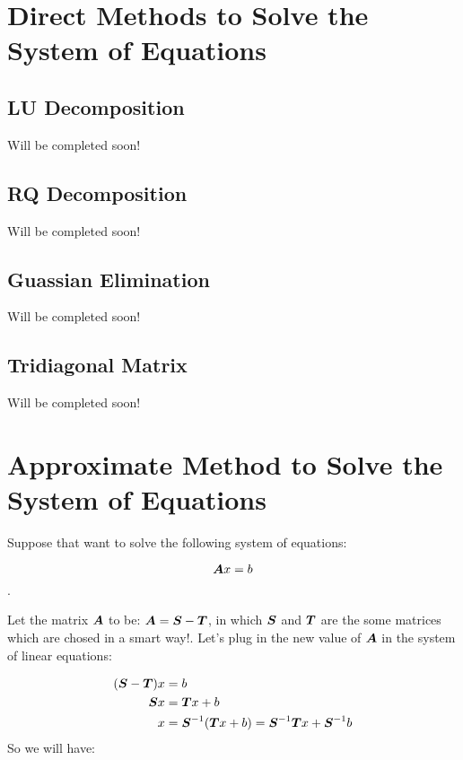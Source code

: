 



\section{Direct Methods to Solve the System of Equations}
\subsection{LU Decomposition}

Will be completed soon!

\subsection{RQ Decomposition}

Will be completed soon!

\subsection{Guassian Elimination}

Will be completed soon!

\subsection{Tridiagonal Matrix}

Will be completed soon!

\section{Approximate Method to Solve the System of Equations}

Suppose that want to solve the following system of equations:

\[ \boldsymbol{A} x = b \].

Let the matrix $\boldsymbol{A}$ to be: $\boldsymbol{A} = \boldsymbol{S} - \boldsymbol{T}$, in which $\boldsymbol{S}$ and $\boldsymbol{T}$ are the some matrices which are chosed in a smart way!. Let's plug in the new value of $\boldsymbol{A}$ in the system of linear equations:

\begin{align*}
	(\boldsymbol{S} - \boldsymbol{T}) x &= b \\
	\boldsymbol{S} x &= \boldsymbol{T} x + b \\
	x &= \boldsymbol{S}^{-1} (\boldsymbol{T} x + b) =  \boldsymbol{S}^{-1} \boldsymbol{T} x + \boldsymbol{S}^{-1} b \\
\end{align*}
So we will have:

